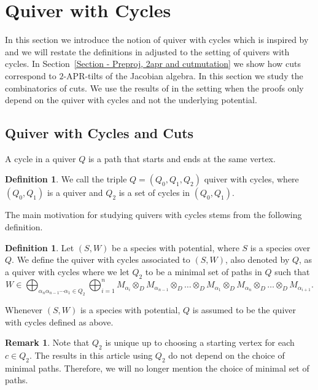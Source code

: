 \documentclass[a4paper, reqno]{amsart}
\theoremstyle{definition}
\newtheorem{mydef}[mythm]{Definition}
\newtheorem{myrem}[mythm]{Remark}
\begin{document}
\section{Quiver with Cycles}\label{section - quiver with cycles}
In this section we introduce the notion of quiver with cycles which is inspired by \cite[Section 8]{HerschendOsamu2011quiverwithpotential} and we will restate the definitions in \cite[Section 6 and Section 7]{HerschendOsamu2011quiverwithpotential} adjusted to the setting of quivers with cycles. In Section~\ref{Section - Preproj, 2apr and cutmutation} we show how cuts correspond to $2$-APR-tilts of the Jacobian algebra. In this section we study the combinatorics of cuts. We use the results of \cite{HerschendOsamu2011quiverwithpotential} in the setting when the proofs only depend on the quiver with cycles and not the underlying potential.

\subsection{Quiver with Cycles and Cuts}
A cycle in a quiver $Q$ is a path that starts and ends at the same vertex.

\begin{mydef}
	We call the triple $Q = (Q_0, Q_1, Q_2)$ quiver with cycles, where $(Q_0, Q_1)$ is a quiver and $Q_2$ is a set of cycles in $(Q_0, Q_1)$. 
\end{mydef}

The main motivation for studying quivers with cycles stems from the following definition.

\begin{mydef}
	Let $(S, W)$ be a species with potential, where $S$ is a species over $Q$. We define the quiver with cycles associated to $(S, W)$, also denoted by $Q$, as a quiver with cycles where we let $Q_2$ to be a minimal set of paths in $Q$ such that
	\begin{equation*}
		W \in \bigoplus_{\alpha_n\alpha_{n-1}\cdots \alpha_1\in Q_2}\bigoplus_{i = 1}^nM_{\alpha_i}\otimes_D M_{\alpha_{n-1}}\otimes_D \dots \otimes_D M_{\alpha_1}\otimes_D M_{\alpha_n} \otimes_D \dots \otimes_D M_{\alpha_{i+1}}.
	\end{equation*}
\end{mydef}

Whenever $(S, W)$ is a species with potential, $Q$ is assumed to be the quiver with cycles defined as above.

\begin{myrem}
	Note that $Q_2$ is unique up to choosing a starting vertex for each $c\in Q_2$. The results in this article using $Q_2$ do not depend on the choice of minimal paths. Therefore, we will no longer mention the choice of minimal set of paths.
\end{myrem}
\end{document}
